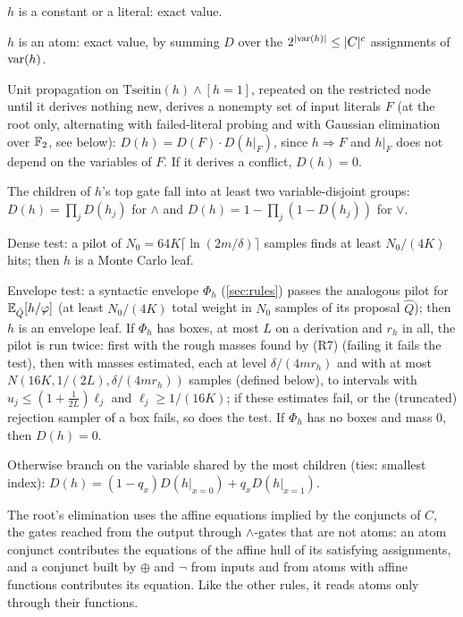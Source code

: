 \begin{description}[style=sameline,leftmargin=1.5em]
\item[(T)] $h$ is a constant or a literal: exact value.
\item[(T$'$)] $h$ is an atom: exact value, by summing $D$ over the
$2^{|\mathrm{var}(h)|}\le|C|^c$ assignments of $\mathrm{var}(h)$.
\item[(F)] Unit propagation on $\mathrm{Tseitin}(h)\wedge[h=1]$, repeated on the
restricted node until it derives nothing new, derives a nonempty set of input
literals $F$ (at the root only, alternating with failed-literal probing and with
Gaussian elimination over $\mathbb{F}_2$, see below): $D(h)=D(F)\cdot D(h|_F)$, since
$h\Rightarrow F$ and $h|_F$ does not depend on the variables of $F$. If it derives a
conflict, $D(h)=0$.
\item[(D)] The children of $h$'s top gate fall into at least two
variable-disjoint groups: $D(h)=\prod_jD(h_j)$ for $\wedge$ and
$D(h)=1-\prod_j(1-D(h_j))$ for $\vee$.
\item[(S)] Dense test: a pilot of $N_0=64K\lceil\ln(2m/\delta)\rceil$ samples
finds at least $N_0/(4K)$ hits; then $h$ is a Monte Carlo leaf.
\item[(E)] Envelope test: a syntactic envelope $\Phi_h$ (\cref{sec:rules})
passes the analogous pilot for $\mathbb{E}_{\hat Q}[h/\varphi]$ (at least $N_0/(4K)$ total
weight in $N_0$ samples of its proposal $\hat Q$); then $h$ is an envelope leaf. If
$\Phi_h$ has boxes, at most $L$ on a derivation and $r_h$ in all, the pilot is run
twice: first with the rough masses found by (R7) (failing it fails the test), then
with masses estimated, each at level $\delta/(4mr_h)$ and with at most
$N(16K,1/(2L),\delta/(4mr_h))$ samples (defined below), to intervals with
$u_j\le(1+\frac1{2L})\ell_j$ and $\ell_j\ge1/(16K)$; if these estimates fail, or
the (truncated) rejection sampler of a box fails, so does the test.
If $\Phi_h$ has no boxes and mass $0$, then $D(h)=0$.
\item[(B)] Otherwise branch on the variable shared by the most children (ties:
smallest index): $D(h)=(1-q_x)D(h|_{x=0})+q_xD(h|_{x=1})$.
\end{description}
The root's elimination uses the affine equations implied by the conjuncts of $C$,
the gates reached from the output through $\wedge$-gates that are not atoms: an atom
conjunct contributes the equations of the affine hull of its satisfying assignments,
and a conjunct built by $\oplus$ and $\neg$ from inputs and from atoms with affine
functions contributes its equation. Like the other rules, it reads atoms only through
their functions.

